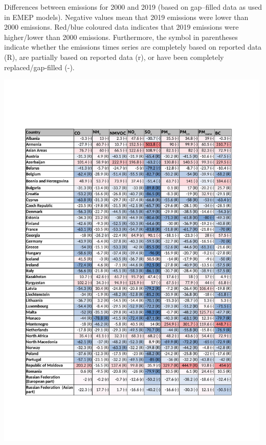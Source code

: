 \begin{table}{}
  \caption{Differences between emissions for 2000 and 2019 (based on gap--filled data as used in EMEP models). Negative values mean that 2019 emissions were lower than 2000 emissions. Red/blue coloured data indicates that 2019 emissions were higher/lower than 2000 emissions. Furthermore, the symbol in parentheses indicate whether the emissions times series are completely based on reported data (R), are partially based on reported data (r), or have been completely replaced/gap-filled (-).}
\centering
{\includegraphics*[viewport=45 100 535 735,clip,width=0.99\textwidth]{FIGS_CEIP/Table3_page1.pdf}}
\label{tab:CEIP3}  
\end{table}

